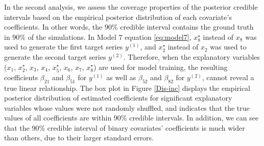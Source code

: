 \documentclass[twoside,11pt]{article}
\begin{document}
In the second analysis, we assess the coverage properties of the posterior credible intervals based on the empirical posterior distribution of each covariate's coefficients. In other words, the $90\%$ credible interval contains the ground truth in $90\%$ of the simulations. In Model $7$ equation \eqref{eq:model7}, $x_8^\star$ instead of $x_8$ was used to generate the first target series $y^{(1)}$, and $x_2^\star$ instead of $x_2$ was used to generate the second target series $y^{(2)}$.
Therefore, when the explanatory variables ($x_1$, $x_2^\star$, $x_3$, $x_4$, $x_5^\star$, $x_6$, $x_7$, $x_8^\star$) are used for model training, the resulting coefficients $\beta_{21}$ and $\beta_{51}$ for $y^{(1)}$ as well as $\beta_{52}$ and $\beta_{82}$ for $y^{(2)}$, cannot reveal a true linear relationship. The box plot in Figure \ref{Dis-inc} displays the empirical posterior distribution of estimated coefficients for significant explanatory variables whose values were not randomly shuffled, and indicates that the true values of all coefficients are within $90\%$ credible intervals. In addition, we can see that the $90\%$ credible interval of binary covariates' coefficients is much wider than others, due to their larger standard errors.


\end{document}
